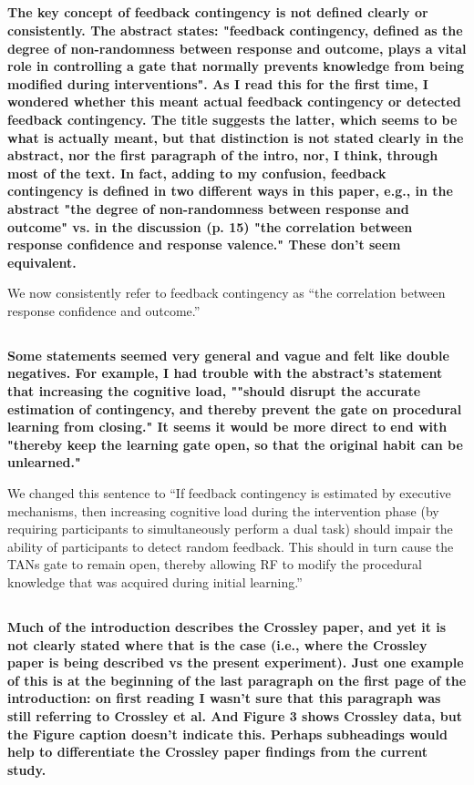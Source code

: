 \documentclass[10pt,a4paper]{article} \usepackage{amsmath} \usepackage{parskip}
\begin{document}
\subsection{} \textbf{
  The key concept of feedback contingency is not defined clearly or consistently.
  The abstract states: "feedback contingency, defined as the degree of
  non-randomness between response and outcome, plays a vital role in controlling a
  gate that normally prevents knowledge from being modified during interventions".
  As I read this for the first time, I wondered whether this meant actual feedback
  contingency or detected feedback contingency. The title suggests the latter,
  which seems to be what is actually meant, but that distinction is not stated
  clearly in the abstract, nor the first paragraph of the intro, nor, I think,
  through most of the text. In fact, adding to my confusion, feedback contingency
  is defined in two different ways in this paper, e.g., in the abstract "the
  degree of non-randomness between response and outcome" vs. in the discussion (p.
  15) "the correlation between response confidence and response valence." These
  don't seem equivalent.
}

We now consistently refer to feedback contingency as ``the correlation between
response confidence and outcome.''

\subsection{} \textbf{
  Some statements seemed very general and vague and felt like double negatives.
  For example, I had trouble with the abstract's statement that increasing the
  cognitive load, ""should disrupt the accurate estimation of contingency, and
  thereby prevent the gate on procedural learning from closing." It seems it would
  be more direct to end with "thereby keep the learning gate open, so that the
  original habit can be unlearned."
}

We changed this sentence to ``If feedback contingency is estimated by
executive mechanisms, then increasing cognitive load during the intervention
phase (by requiring participants to simultaneously perform a dual task) should
impair the ability of participants to detect random feedback. This should in
turn cause the TANs gate to remain open, thereby allowing RF to modify the
procedural knowledge that was acquired during initial learning.''

\subsection{} \textbf{
  Much of the introduction describes the Crossley paper, and yet it is not clearly
  stated where that is the case (i.e., where the Crossley paper is being described
  vs the present experiment). Just one example of this is at the beginning of the
  last paragraph on the first page of the introduction: on first reading I wasn't
  sure that this paragraph was still referring to Crossley et al. And Figure 3
  shows Crossley data, but the Figure caption doesn't indicate this. Perhaps
  subheadings would help to differentiate the Crossley paper findings from the
  current study.
}
\end{document}
